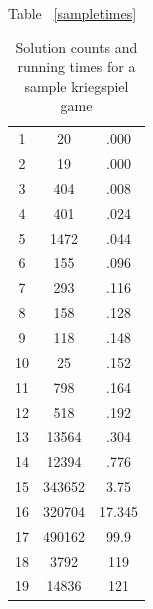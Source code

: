 \documentclass[11pt]{article}
\begin{document}
Table ~\ref{sampletimes}
\begin{table}
\begin{tabular}{ccc}
1 & 20 & .000\\
2 & 19 & .000\\
3 & 404 & .008\\
4 & 401 & .024\\
5 & 1472 & .044\\
6 & 155 & .096\\
7 & 293 & .116\\
8 & 158 & .128\\
9 & 118 & .148\\
10 & 25 & .152\\
11 & 798 & .164\\
12 & 518 & .192\\
13 & 13564 & .304\\
14 & 12394 & .776\\
15 & 343652 & 3.75\\
16 & 320704 & 17.345\\
17 & 490162 & 99.9\\
18 & 3792 & 119\\
19 & 14836 & 121 \\
\end{tabular}
\caption{Solution counts and running times for a sample kriegspiel game}
\label{blacktimes}
\end{table}




\nocite{richards09information}
\nocite{russell05efficient}
\nocite{kuhn03lectures}
\nocite{kuhn97classics}
\nocite{parker05sampling}
\nocite{nance06reasoning}
\nocite{li94chess}



\end{document}
